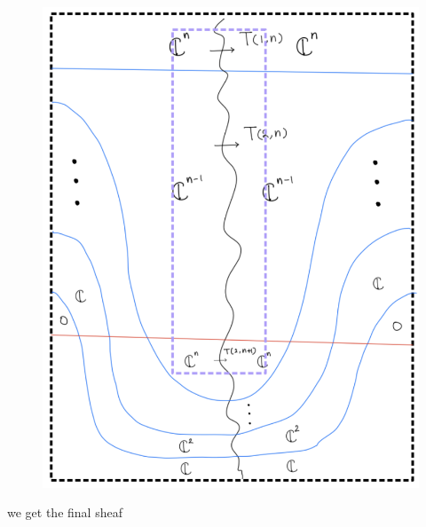 \begin{enumerate}[label=(\roman*)]
\begin{enumerate}[label=(Step \arabic*)]
\begin{figure}[H]
    \centering
    \includegraphics[scale = 0.95]{diagrams/cobord6/6.png}
    \caption{}
    \label{fig:your-label}
\end{figure}

we get the final sheaf


\end{enumerate}
\end{enumerate}
